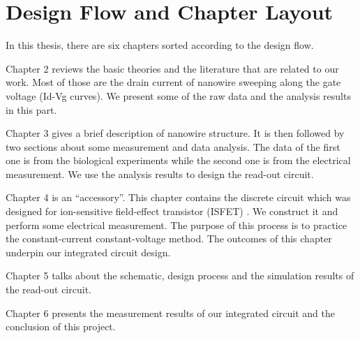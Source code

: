 \section{Design Flow and Chapter Layout}
In this thesis, there are six chapters sorted according to the design flow.

Chapter 2 reviews the basic theories and the literature that are related to our work.
Most of those are the drain current of nanowire sweeping along the gate voltage (Id-Vg curves).
We present some of the raw data and the analysis results in this part.

Chapter 3 gives a brief description of nanowire structure.
It is then followed by two sections about some measurement and data analysis.
The data of the first one is from the biological experiments while the second one is from the electrical measurement.
We use the analysis results to design the read-out circuit.

Chapter 4 is an ``accessory''.
This chapter contains the discrete circuit which was designed for ion-sensitive field-effect transistor (ISFET) \cite{SF1}.
We construct it and perform some electrical measurement.
The purpose of this process is to practice the constant-current constant-voltage method.
The outcomes of this chapter underpin our integrated circuit design.

Chapter 5 talks about the schematic, design process and the simulation results of the read-out circuit.

Chapter 6 presents the measurement results of our integrated circuit and the conclusion of this project.








%
%
%
%

